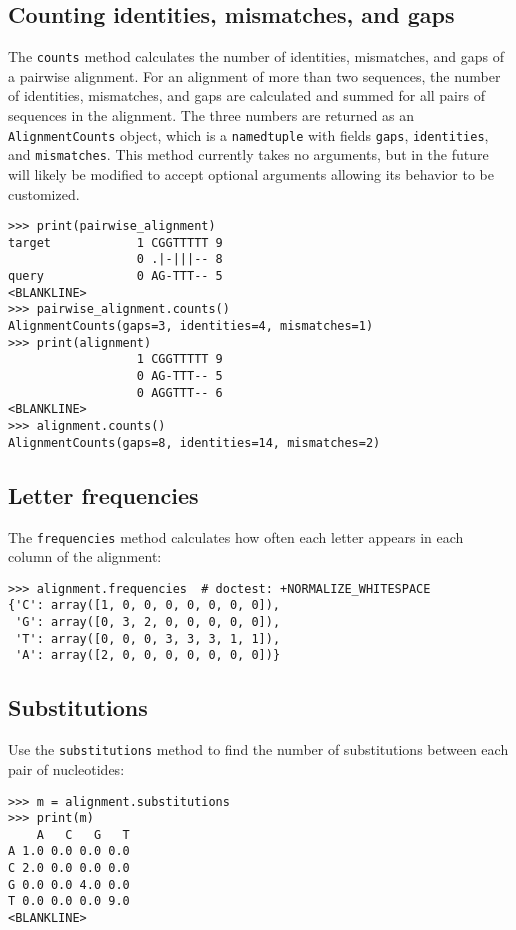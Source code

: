 \subsection{Counting identities, mismatches, and gaps}

The \verb|counts| method calculates the number of identities, mismatches, and gaps of a pairwise alignment.
For an alignment of more than two sequences, the number of identities, mismatches, and gaps are calculated and summed for all pairs of sequences in the alignment. The three numbers are returned as an \verb|AlignmentCounts| object, which is a \verb|namedtuple| with fields \verb|gaps|, \verb|identities|, and \verb|mismatches|. This method currently takes no arguments, but in the future will likely be modified to accept optional arguments allowing its behavior to be customized.
\begin{verbatim}
>>> print(pairwise_alignment)
target            1 CGGTTTTT 9
                  0 .|-|||-- 8
query             0 AG-TTT-- 5
<BLANKLINE>
>>> pairwise_alignment.counts()
AlignmentCounts(gaps=3, identities=4, mismatches=1)
>>> print(alignment)
                  1 CGGTTTTT 9
                  0 AG-TTT-- 5
                  0 AGGTTT-- 6
<BLANKLINE>
>>> alignment.counts()
AlignmentCounts(gaps=8, identities=14, mismatches=2)
\end{verbatim}

\subsection{Letter frequencies}

The \verb+frequencies+ method calculates how often each letter appears in each column of the alignment:
\begin{verbatim}
>>> alignment.frequencies  # doctest: +NORMALIZE_WHITESPACE
{'C': array([1, 0, 0, 0, 0, 0, 0, 0]),
 'G': array([0, 3, 2, 0, 0, 0, 0, 0]),
 'T': array([0, 0, 0, 3, 3, 3, 1, 1]),
 'A': array([2, 0, 0, 0, 0, 0, 0, 0])}
\end{verbatim}

\subsection{Substitutions}

Use the \verb+substitutions+ method to find the number of substitutions between each pair of nucleotides:
\begin{verbatim}
>>> m = alignment.substitutions
>>> print(m)
    A   C   G   T
A 1.0 0.0 0.0 0.0
C 2.0 0.0 0.0 0.0
G 0.0 0.0 4.0 0.0
T 0.0 0.0 0.0 9.0
<BLANKLINE>
\end{verbatim}

